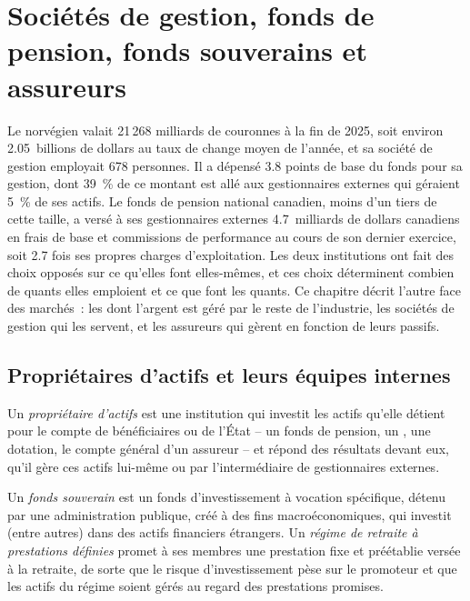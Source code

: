 \chapter{Sociétés de gestion, fonds de pension, fonds souverains et assureurs}\label{ch:in:asset-managers-pensions-sovereign-funds-and-insurers}

Le  norvégien valait 21\,268 milliards de couronnes à la fin de 2025, soit environ 2.05~billions de dollars au
taux de change moyen de l'année, et sa société de gestion employait 678 personnes. Il a dépensé 3.8 points de base du fonds pour sa gestion, dont 39~\%
de ce montant est allé aux gestionnaires externes qui géraient 5~\% de ses actifs. Le fonds de pension national canadien, moins d'un tiers de cette taille,
a versé à ses gestionnaires externes 4.7~milliards de dollars canadiens en frais de base et commissions de performance au cours de son dernier exercice, soit 2.7 fois ses propres
charges d'exploitation. Les deux institutions ont fait des choix opposés sur ce qu'elles font elles-mêmes, et ces choix déterminent combien
de quants elles emploient et ce que font les quants. Ce chapitre décrit l'autre face des marchés~: les 
dont l'argent est géré par le reste de l'industrie, les sociétés de gestion qui les servent, et les assureurs qui gèrent en
fonction de leurs passifs.

\section{Propriétaires d'actifs et leurs équipes internes}

\begin{definition}\label{def:in:asset-managers-pensions-sovereign-funds-and-insurers:owner}
Un \emph{propriétaire d'actifs} est une institution qui investit les actifs qu'elle détient pour le compte de bénéficiaires ou de
l'État -- un fonds de pension, un , une dotation, le compte général d'un assureur -- et répond des
résultats devant eux, qu'il gère ces actifs lui-même ou par l'intermédiaire de gestionnaires externes.
\end{definition}

\begin{definition}\label{def:in:asset-managers-pensions-sovereign-funds-and-insurers:swf}
Un \emph{fonds souverain} est un fonds d'investissement à vocation spécifique, détenu par une
administration publique, créé à des fins macroéconomiques, qui investit (entre autres) dans des actifs financiers étrangers. Un
\emph{régime de retraite à prestations définies} promet à ses membres une prestation fixe et préétablie
versée à la retraite, de sorte que le risque d'investissement pèse sur le promoteur et que les actifs du régime soient gérés au regard des
prestations promises.
\end{definition}


